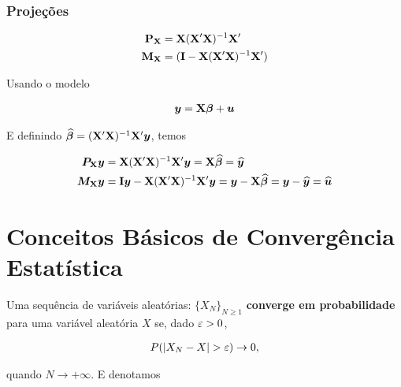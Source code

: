 \documentclass[11pt, oneside, a4paper, article]{article}
\numberwithin{equation}{section}
\begin{document}
\begin{description}
\subsubsection{Projeções}

\vspace{-2 em}
\begin{align*}
	\mathbf{P}_{\mathbf{X}} &= \mathbf{X} (\mathbf{X}' \mathbf{X})^{-1} \mathbf{X}'
	\\
	\mathbf{M}_{\mathbf{X}} &= (\mathbf{I} - \mathbf{X} (\mathbf{X}' \mathbf{X})^{-1} \mathbf{X}')
\end{align*}

Usando o modelo

\vspace{-1 em}
\begin{align*}
	\boldsymbol{y} = \mathbf{X} \boldsymbol{\beta} + \boldsymbol{u}
\end{align*}

E definindo $\widehat{\boldsymbol{\beta}} = (\mathbf{X}' \mathbf{X})^{-1} \mathbf{X}' \boldsymbol{y}$, temos

\vspace{-1 em}
\begin{align*}
\boldsymbol{P}_{\mathbf{X}}\boldsymbol{y}  &= \mathbf{X} (\mathbf{X}' \mathbf{X})^{-1} \mathbf{X}' \boldsymbol{y} = \mathbf{X} \widehat{\boldsymbol{\beta}} = \widehat{\boldsymbol{y}}
\\
\boldsymbol{M}_{\mathbf{X}}\boldsymbol{y}  &= \mathbf{I} \boldsymbol{y}  - \mathbf{X} (\mathbf{X}' \mathbf{X})^{-1} \mathbf{X}' \boldsymbol{y} 
=
\boldsymbol{y}  - \mathbf{X} \widehat{\boldsymbol{\beta}} 
=
\boldsymbol{y} - \widehat{\boldsymbol{y}} = \widehat{\boldsymbol{u}}
\end{align*}


\clearpage
\section{Conceitos Básicos de Convergência Estatística} \label{app:est}

\begin{defn}
\citet[Def 3.3, p.36 ]{wool-2010}

Uma sequência de variáveis aleatórias:
$\{ X_{N} \}_{N \geq 1}$ 
\textbf{converge em probabilidade} para uma variável aleatória $X$ se, dado $\varepsilon > 0$, 

\vspace{-1 em}
\begin{align*}
	P(| X_{N} - X | > \varepsilon ) \to 0,
\end{align*}

\noindent
quando $N \to + \infty$.
E denotamos


\end{defn}
\end{description}
\end{document}
